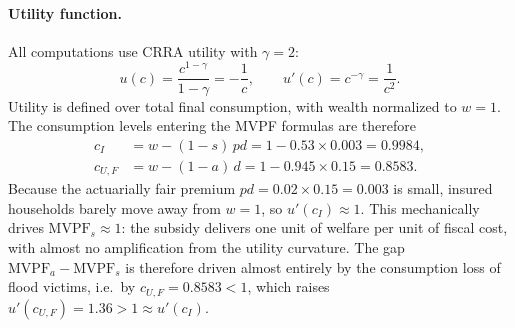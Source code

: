 \documentclass[12pt]{article}
\begin{document}
\paragraph{Utility function.}
All computations use CRRA utility with $\gamma = 2$:
\[
    u(c) = \frac{c^{1-\gamma}}{1-\gamma} = -\frac{1}{c}, \qquad u'(c) = c^{-\gamma} = \frac{1}{c^2}.
\]
Utility is defined over total final consumption, with wealth normalized to $w = 1$.
The consumption levels entering the MVPF formulas are therefore
\begin{align*}
    c_I     &= w - (1-s)\,pd = 1 - 0.53 \times 0.003 = 0.9984, \\
    c_{U,F} &= w - (1-a)\,d = 1 - 0.945 \times 0.15 = 0.8583.
\end{align*}
Because the actuarially fair premium $pd = 0.02 \times 0.15 = 0.003$ is small, insured households barely move away from $w = 1$, so $u'(c_I) \approx 1$.
This mechanically drives $\mathrm{MVPF}_s \approx 1$: the subsidy delivers one unit of welfare per unit of fiscal cost, with almost no amplification from the utility curvature.
The gap $\mathrm{MVPF}_a - \mathrm{MVPF}_s$ is therefore driven almost entirely by the consumption loss of flood victims, i.e.\ by $c_{U,F} = 0.8583 < 1$, which raises $u'(c_{U,F}) = 1.36 > 1 \approx u'(c_I)$.
\end{document}

